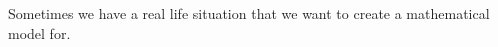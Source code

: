 \documentclass[class=article, crop=false]{standalone}
\begin{document}
Sometimes we have a real life situation that we want to create a mathematical model for. 
\end{document}

